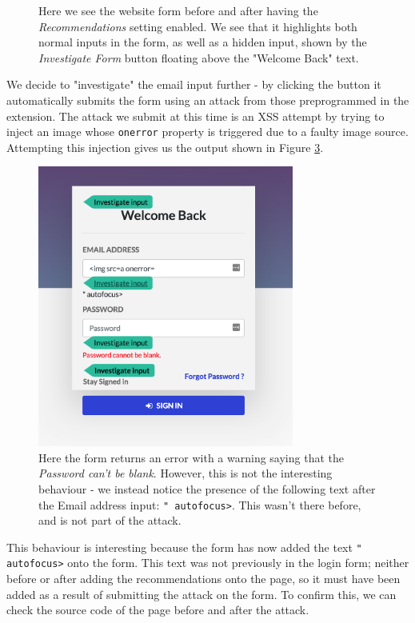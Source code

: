 \begin{figure}[h]
\begin{subfigure}{.5\textwidth}
		\label{fig:recommendations_anon}
	\end{subfigure}
	\caption{Here we see the website form before and after having the \textit{Recommendations} setting enabled. We see that it highlights both normal inputs in the form, as well as a hidden input, shown by the \textit{Investigate Form} button floating above the "Welcome Back" text.}
	\label{fig:vuln_page}
\end{figure} 

We decide to "investigate" the email input further - by clicking the button it automatically submits the form using an attack from those preprogrammed in the extension. The attack we submit at this time is an XSS attempt by trying to inject an image whose \texttt{onerror} property is triggered due to a faulty image source. Attempting this injection gives us the output shown in Figure \ref{fig:trigger_point}. \\

\begin{figure}[h!]
	\centering
	\includegraphics[width=0.75\textwidth]{images/test_case_1/trigger_point_anon.png}
	\caption{Here the form returns an error with a warning saying that the \textit{Password can't be blank}. However, this is not the interesting behaviour - we instead notice the presence of the following text after the Email address input: \texttt{" autofocus>}. This wasn't there before, and is not part of the attack.}
	\label{fig:trigger_point}
\end{figure}

This behaviour is interesting because the form has now added the text \texttt{" autofocus>} onto the form. This text was not previously in the login form; neither before or after adding the recommendations onto the page, so it must have been added as a result of submitting the attack on the form. To confirm this, we can check the source code of the page before and after the attack. 

